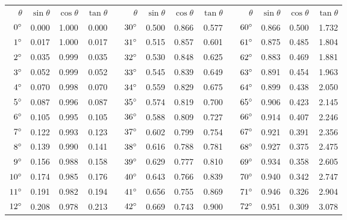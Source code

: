 \huge{\bfseries{}}\normalsize\normalfont

\begin{tabular}{rrrrrrrrrrrrrr}
$\theta$ & $\sin\theta$ & $\cos\theta$ & $\tan\theta$ & &
$\theta$ & $\sin\theta$ & $\cos\theta$ & $\tan\theta$ & &
$\theta$ & $\sin\theta$ & $\cos\theta$ & $\tan\theta$ \\
\cline{1-4}  \cline{6-9}  \cline{11-14}
$0\mspace{0mu}^\circ$ &  0.000  &  1.000  &  0.000 & & $30\mspace{0mu}^\circ$ &  0.500  &  0.866  &  0.577 & & $60\mspace{0mu}^\circ$ &  0.866  &  0.500  &  1.732\\
$1\mspace{0mu}^\circ$ &  0.017  &  1.000  &  0.017 & & $31\mspace{0mu}^\circ$ &  0.515  &  0.857  &  0.601 & & $61\mspace{0mu}^\circ$ &  0.875  &  0.485  &  1.804\\
$2\mspace{0mu}^\circ$ &  0.035  &  0.999  &  0.035 & & $32\mspace{0mu}^\circ$ &  0.530  &  0.848  &  0.625 & & $62\mspace{0mu}^\circ$ &  0.883  &  0.469  &  1.881\\
$3\mspace{0mu}^\circ$ &  0.052  &  0.999  &  0.052 & & $33\mspace{0mu}^\circ$ &  0.545  &  0.839  &  0.649 & & $63\mspace{0mu}^\circ$ &  0.891  &  0.454  &  1.963\\
$4\mspace{0mu}^\circ$ &  0.070  &  0.998  &  0.070 & & $34\mspace{0mu}^\circ$ &  0.559  &  0.829  &  0.675 & & $64\mspace{0mu}^\circ$ &  0.899  &  0.438  &  2.050\\
$5\mspace{0mu}^\circ$ &  0.087  &  0.996  &  0.087 & & $35\mspace{0mu}^\circ$ &  0.574  &  0.819  &  0.700 & & $65\mspace{0mu}^\circ$ &  0.906  &  0.423  &  2.145\\
$6\mspace{0mu}^\circ$ &  0.105  &  0.995  &  0.105 & & $36\mspace{0mu}^\circ$ &  0.588  &  0.809  &  0.727 & & $66\mspace{0mu}^\circ$ &  0.914  &  0.407  &  2.246\\
$7\mspace{0mu}^\circ$ &  0.122  &  0.993  &  0.123 & & $37\mspace{0mu}^\circ$ &  0.602  &  0.799  &  0.754 & & $67\mspace{0mu}^\circ$ &  0.921  &  0.391  &  2.356\\
$8\mspace{0mu}^\circ$ &  0.139  &  0.990  &  0.141 & & $38\mspace{0mu}^\circ$ &  0.616  &  0.788  &  0.781 & & $68\mspace{0mu}^\circ$ &  0.927  &  0.375  &  2.475\\
$9\mspace{0mu}^\circ$ &  0.156  &  0.988  &  0.158 & & $39\mspace{0mu}^\circ$ &  0.629  &  0.777  &  0.810 & & $69\mspace{0mu}^\circ$ &  0.934  &  0.358  &  2.605\\
$10\mspace{0mu}^\circ$ &  0.174  &  0.985  &  0.176 & & $40\mspace{0mu}^\circ$ &  0.643  &  0.766  &  0.839 & & $70\mspace{0mu}^\circ$ &  0.940  &  0.342  &  2.747\\
$11\mspace{0mu}^\circ$ &  0.191  &  0.982  &  0.194 & & $41\mspace{0mu}^\circ$ &  0.656  &  0.755  &  0.869 & & $71\mspace{0mu}^\circ$ &  0.946  &  0.326  &  2.904\\
$12\mspace{0mu}^\circ$ &  0.208  &  0.978  &  0.213 & & $42\mspace{0mu}^\circ$ &  0.669  &  0.743  &  0.900 & & $72\mspace{0mu}^\circ$ &  0.951  &  0.309  &  3.078\\

\end{tabular}
